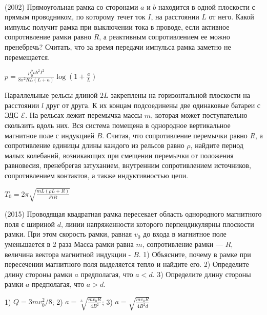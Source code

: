 \begin{ex}
\hspace{0pt} \\
\begin{minipage}{.65\textwidth}
(2002) Прямоугольная рамка со сторонами $a$ и $b$ находится в одной плоскости с прямым проводником, по которому течет ток $I$, на расстоянии $L$ от него. Какой импульс получит рамка при выключении тока в проводе, если активное сопротивление рамки равно $R$, а реактивным сопротивлением ее можно пренебречь? 
Считать, что за время передачи импульса рамка заметно не перемещается.
\end{minipage}
\begin{minipage}{.35\textwidth}
\centering

\end{minipage}
\begin{ans}
$p=\frac{\mu_0^2ab^2I^2}{8\pi^2RL(L+a)}\log\left( 1+\frac{a}{L} \right)$
\end{ans}
\end{ex}

\begin{ex}
Параллельные рельсы длиной $2L$ закреплены на горизонтальной плоскости на расстоянии $l$ друг от друга. 
К их концам подсоединены две одинаковые батареи с ЭДС  $\mathcal{E}$. На рельсах лежит перемычка массы $m$, 
которая может поступательно скользить вдоль них. Вся система помещена в однородное вертикальное магнитное поле с индукцией $B$. 
Считая, что сопротивление перемычки равно $R$, а сопротивление единицы длины каждого из рельсов равно $\rho$, найдите период малых колебаний, возникающих при смещении перемычки от положения равновесия, пренебрегая затуханием, внутренним сопротивлением источников, сопротивлением контактов, а также индуктивностью цепи.
\begin{center}

\end{center}
\begin{ans}
$T_0 = 2 \pi \sqrt{\frac{mL(\rho L + R)}{\mathcal{E}lB}}$
\end{ans}
\end{ex}

\begin{ex}
(2015) Проводящая квадратная рамка пересекает область однородного магнитного поля с шириной $d$, линии напряженности которого перпендикулярны плоскости рамки. При этом скорость рамки, равная $v_0$ до входа в магнитное поле уменьшается в 2 раза Масса рамки равна $m$, сопротивление рамки — $R$, величина вектора магнитной индукции - $B$. 1) Объясните, почему в рамке при пересечении магнитного поля выделяется тепло и найдите его. 2) Определите длину стороны рамки $a$ предполагая, что $a<d$. 3) Определите длину стороны рамки $a$ предполагая, что $a>d$.
\begin{ans}
1) $Q = 3mv_0^2/8$; 2) $a=\sqrt[3]{\frac{mv_0R}{4B^2}}$; 3) $a=\sqrt{\frac{mv_0R}{4B^2d}}$
\end{ans}
\end{ex}